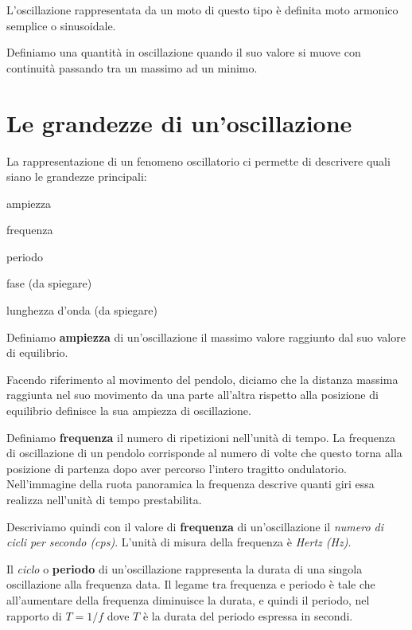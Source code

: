 

L'oscillazione rappresentata da un moto di questo tipo è definita moto armonico
semplice o sinusoidale.

Definiamo una quantità in oscillazione quando il suo valore si muove con
continuità passando tra un massimo ad un minimo.

\clearpage

\section{Le grandezze di un'oscillazione}

La rappresentazione di un fenomeno oscillatorio ci permette di descrivere
quali siano le grandezze principali:

\begin{compactitem}
	\item ampiezza
	\item frequenza
	\item periodo
	\item fase (da spiegare)
	\item lunghezza d'onda (da spiegare)
\end{compactitem}

Definiamo \textbf{ampiezza} di un'oscillazione il massimo valore raggiunto
dal suo valore di equilibrio.

Facendo riferimento al movimento del pendolo, diciamo che la distanza massima
raggiunta nel suo movimento da una parte all'altra rispetto alla posizione di
equilibrio definisce la sua ampiezza di oscillazione.



Definiamo \textbf{frequenza} il numero di ripetizioni nell'unità di tempo. La
frequenza di oscillazione di un pendolo corrisponde al numero di volte che questo
torna alla posizione di partenza dopo aver percorso l'intero tragitto ondulatorio.
Nell'immagine della ruota panoramica la frequenza descrive quanti giri essa realizza
nell'unità di tempo prestabilita.

Descriviamo quindi con il valore di \textbf{frequenza} di un'oscillazione il
\emph{numero di cicli per secondo (cps)}. L'unità di misura della frequenza è
\emph{Hertz (Hz)}.



Il \emph{ciclo} o \textbf{periodo} di un'oscillazione rappresenta la durata di
una singola oscillazione alla frequenza data.
Il legame tra frequenza e periodo è tale che all'aumentare della frequenza
diminuisce la durata, e quindi il periodo, nel rapporto di $T = 1/f$ dove
$T$ è la durata del periodo espressa in secondi.

